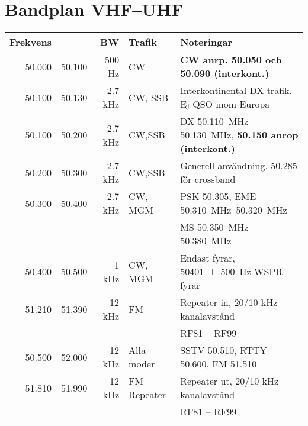 \section{Bandplan VHF--UHF}

\begin{tabular}{rrrll}
\textbf{Frekvens} &        & \textbf{BW} & \textbf{Trafik}
& \textbf{Noteringar} \\ \hline

50.000 & 50.100 & 500 Hz  & CW          & \textbf{CW anrp. 50.050 och 50.090 (interkont.)}                            \\ \hline
50.100 & 50.130 & 2.7 kHz & CW, SSB     & Interkontinental DX-trafik. Ej QSO inom Europa                              \\ \hline
50.100 & 50.200 & 2.7 kHz & CW,SSB      & DX \SIrange{50,110}{50,130}{MHz}, \textbf{\SI{50,150}{} anrop (interkont.)} \\ \hline
50.200 & 50.300 & 2.7 kHz & CW,SSB      & Generell användning. \num{50,285} för crossband                             \\ \hline
50.300 & 50.400 & 2.7 kHz & CW, MGM     & PSK \num{50,305}, EME \SIrange{50,310}{50,320}{MHz}                         \\
       &        &         &             & MS \SIrange{50,350}{50,380}{MHz}                                            \\ \hline
50.400 & 50.500 & 1 kHz   & CW, MGM     & Endast fyrar, \SI{50401(500)}{Hz} WSPR-fyrar                                \\ \hline
51.210 & 51.390 & 12 kHz  & FM          & Repeater in, 20/10 kHz kanalavstånd                                         \\
       &        &         &             & RF81 – RF99                                                                 \\ \hline
50.500 & 52.000 & 12 kHz  & Alla moder  & SSTV \num{50,510}, RTTY \num{50,600}, FM \num{51,510}                       \\ \hline
51.810 & 51.990 & 12 kHz  & FM Repeater & Repeater ut, 20/10 kHz kanalavstånd                                         \\
       &        &         &             & RF81 – RF99                                                                 \\ \hline
\end{tabular}

